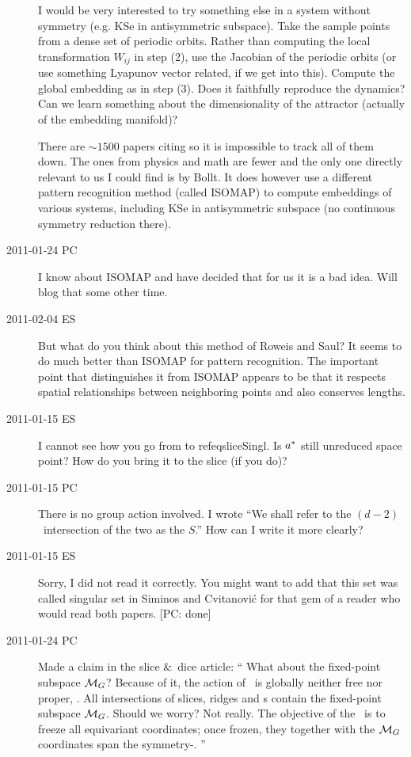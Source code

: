 \begin{description}
  I would be very interested to try something else in a system without symmetry
  (e.g. KSe in antisymmetric subspace). Take the sample points from a dense
  set of periodic orbits. Rather than computing the  local transformation
  $W_{ij}$ in step (2), use the Jacobian of the periodic orbits
  (or use something Lyapunov vector related, if we get into this).
  Compute the global embedding as in step (3). Does it faithfully reproduce
  the dynamics? Can we learn something about the dimensionality of
  the attractor (actually of the embedding manifold)?

  There are $\sim1500$ papers citing  so it is impossible to track
  all of them down. The ones from physics and math are fewer and the only one
  directly relevant to us I could find is by Bollt.
  It does however use a different pattern recognition method (called ISOMAP)
  to compute embeddings of various systems, including KSe in antisymmetric
  subspace (no continuous symmetry reduction there).

\item[2011-01-24 PC] I know about ISOMAP and have decided that for us
it is a bad idea. Will blog that some other time.

\item[2011-02-04 ES] But what do you think about this method of Roweis and
Saul? It seems to do much better than ISOMAP for pattern recognition.
The important point that distinguishes it from ISOMAP appears to be that
it respects spatial relationships between neighboring points and
also conserves lengths.

\item[2011-01-15 ES]
I cannot see how you go from  to  refeq{sliceSingl}.
Is $a^\ast$ still unreduced space point? How do you bring it to the
slice (if you do)?

\item[2011-01-15 PC] There is no group action involved. I wrote
``We shall refer to the $(d\!-\!2)$\dmn\ intersection of the two as the
{\em \sset} $S$.'' How can I write it more clearly?

\item[2011-01-15 ES] Sorry, I did not read it correctly. You might want to
add that this set was called singular set in
Siminos and Cvitanovi\'c for that gem of a reader who would
read both papers. [PC: done]

\item[2011-01-24 PC] Made a claim in the slice \&\ dice article:
``
What about the fixed-point subspace ${\cal M}_{G}$?
Because of it, the action of \Group\ is globally neither free nor proper,
\etc. All intersections of slices, ridges and {\chartBord s} contain the
fixed-point subspace ${\cal M}_{G}$. Should we worry? Not really. The
objective of the \mslices\ is to freeze all equivariant coordinates; once
frozen, they together with the  ${\cal M}_{G}$ coordinates span the
symmetry-\reducedsp.
''


\end{description}
